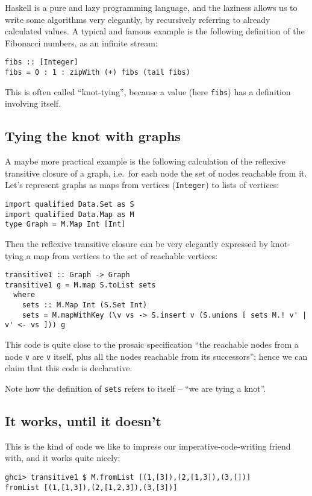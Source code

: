 \documentclass[manuscript,screen,acmsmall]{acmart}
\begin{document}
Haskell is a pure and lazy programming language, and the laziness allows us to write some algorithms very elegantly, by recursively referring to already calculated values. A typical and famous example is the following definition of the Fibonacci numbers, as an infinite stream:
\begin{verbatim}
fibs :: [Integer]
fibs = 0 : 1 : zipWith (+) fibs (tail fibs)
\end{verbatim}
This is often called “knot-tying”, because a value (here \verb|fibs|) has a definition involving itself.

\subsection{Tying the knot with graphs}

A maybe more practical example is the following calculation of the reflexive transitive closure of a graph, i.e.\ for each node the set of nodes reachable from it. Let's represent graphs as maps from vertices (\verb|Integer|) to lists of vertices:
\begin{verbatim}
import qualified Data.Set as S
import qualified Data.Map as M
type Graph = M.Map Int [Int]
\end{verbatim}

Then the reflexive transitive closure can be very elegantly expressed by knot-tying a map from vertices to the set of reachable vertices:
\begin{verbatim}
transitive1 :: Graph -> Graph
transitive1 g = M.map S.toList sets
  where
    sets :: M.Map Int (S.Set Int)
    sets = M.mapWithKey (\v vs -> S.insert v (S.unions [ sets M.! v' | v' <- vs ])) g
\end{verbatim}
This code is quite close to the prosaic specification “the reachable nodes from a node \verb|v| are \verb|v| itself, plus all the nodes reachable from its successors”; hence we can claim that this code is declarative.

Note how the definition of \verb|sets| refers to itself -- “we are tying a knot”.

\subsection{It works, until it doesn't}

This is the kind of code we like to impress our imperative-code-writing friend with, and it works quite nicely:
\begin{verbatim}
ghci> transitive1 $ M.fromList [(1,[3]),(2,[1,3]),(3,[])]
fromList [(1,[1,3]),(2,[1,2,3]),(3,[3])]
\end{verbatim}
\end{document}
